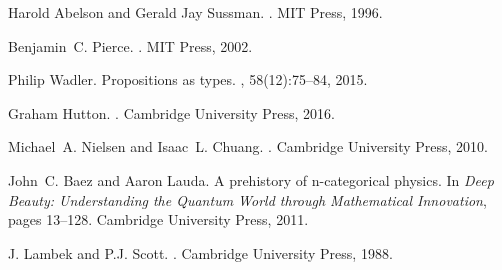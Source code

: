 \documentclass[12pt]{article}
\begin{document}
\begin{thebibliography}{10}

Harold Abelson and Gerald Jay Sussman.
.
\newblock MIT Press, 1996.

Benjamin~C. Pierce.
.
\newblock MIT Press, 2002.

Philip Wadler.
\newblock Propositions as types.
, 58(12):75--84, 2015.

Graham Hutton.
.
\newblock Cambridge University Press, 2016.

Michael~A. Nielsen and Isaac~L. Chuang.
.
\newblock Cambridge University Press, 2010.

John~C. Baez and Aaron Lauda.
\newblock A prehistory of n-categorical physics.
\newblock In {\em Deep Beauty: Understanding the Quantum World through
  Mathematical Innovation}, pages 13--128. Cambridge University Press, 2011.

J. Lambek and P.J. Scott.
.
\newblock Cambridge University Press, 1988.

\end{thebibliography}
\end{document}
